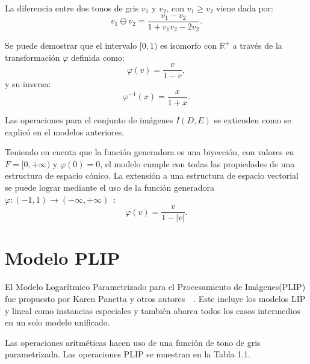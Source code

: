 La diferencia entre dos tonos de gris $v_1$ y $v_2$, con $v_1 \geq v_2$ viene dada por:
\begin{equation}
	v_1\ominus v_2=\frac{v_1-v_2}{1+v_1v_2-2v_2}.
\end{equation}

Se puede demostrar que el intervalo $[0, 1)$ es isomorfo con $\mathbb{R}^+$ a través de la transformaci\'on $\varphi$ definida como:
\begin{equation}
	\varphi(v)=\frac{v}{1-v},
\end{equation}
y su inversa:
\begin{equation}
	\varphi^{-1}(x)=\frac{x}{1+x}.
\end{equation}

Las operaciones para el conjunto de im\'agenes $I(D,E)$ se extienden como se explic\'o en el modelos anteriores.

Teniendo en cuenta que la función generadora es una biyección, con valores en $F = [ 0 , +\infty )$ y $\varphi(0)=0$, el modelo cumple con todas las propiedades de una estructura de espacio cónico. La extensión a una estructura de espacio vectorial se puede lograr mediante el uso de la función generadora $\varphi:(-1,1)\rightarrow (-\infty,+\infty)$~\cite{florea2009piecewise}:
\begin{equation}
	\varphi(v)=\frac{v}{1-|v|}.
\end{equation}

\section{Modelo PLIP}

El Modelo Logar\'itmico Parametrizado para el Procesamiento de Im\'agenes(PLIP) fue propuesto por Karen Panetta y otros autores~\cite{panetta2007parameterization}~\cite{panetta2010parameterized}. Este incluye los modelos LIP y lineal como instancias especiales y también abarca todos los casos intermedios en un solo modelo unificado.

Las operaciones aritméticas hacen uso de una función de tono de gris parametrizada. Las operaciones PLIP se muestran en la Tabla 1.1.

